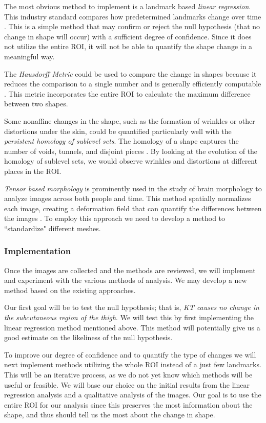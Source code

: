 \documentclass[ letterpaper, 12 pt, conference]{ieeeconf}  %
\begin{document}
The most obvious method to implement is a landmark based \emph{linear regression}.  This industry standard compares how predetermined landmarks change over time \cite{Heimann2009}.  This is a simple method that may confirm or reject the null hypothesis (that no change in shape will occur) with a sufficient degree of confidence. Since it does not utilize the entire \ac{ROI}, it will not be able to quantify the shape change in a meaningful way.  

The \emph{Hausdorff Metric} could be used to compare the change in shapes because it reduces the comparison to a single number and is generally efficiently computable \cite{Chazal2009}.  This metric incorporates the entire \ac{ROI} to calculate the maximum difference between two shapes.

Some nonaffine changes in the shape, such as the formation of wrinkles or other distortions under the skin, could be quantified particularly well with the \emph{persistent homology of sublevel sets}.  The homology of a shape captures the number of voids, tunnels, and disjoint pieces \cite{Carlsson2009} \cite{Edelsbrunner2010}.  By looking at the evolution of the homology of sublevel sets, we would observe wrinkles and distortions at different places in the \ac{ROI}.

\emph{Tensor based morphology} is prominently used in the study of brain morphology to analyze images across both people and time.  This method spatially normalizes each image, creating a deformation field that can quantify the differences between the images \cite{Grossmann2002} \cite{Lepore2008}. To employ this approach we need to develop a method to ``standardize" different meshes.

\subsubsection{Implementation}

Once the images are collected and the methods are reviewed, we will implement and experiment with the various methods of analysis.  We may develop a new method based on the existing approaches. 

Our first goal will be to test the null hypothesis;  that is, \emph{KT causes no change in the subcutaneous region of the thigh}. We will test this by first implementing the linear regression method mentioned above.  This method will potentially give us a good estimate on the likeliness of the null hypothesis.

To improve our degree of confidence and to quantify the type of changes we will next implement methods utilizing the whole \ac{ROI} instead of a just few landmarks.  This will be an iterative process, as we do not yet know which methods will be useful or feasible.  We will base our choice on the initial results from the linear regression analysis and a qualitative analysis of the images.   Our goal is to use the entire \ac{ROI} for our analysis since this preserves the most information about the shape, and thus should tell us the most about the change in shape.  
\end{document}
